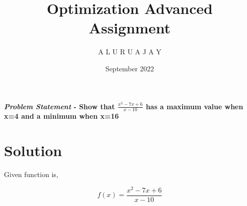 \documentclass[10pt,twocolumn]{article}
\title{\textbf{Optimization Advanced Assignment}}
\author{A L U R U A J A Y}
\date{September 2022}
\begin{document}
\maketitle
\paragraph{\textit{Problem Statement} - Show that $\frac{x^2-7x+6}{x-10}$ 
has a maximum value when x=4 and a minimum when x=16}

\section{Solution}
\begin{flushleft}
Given function is,\\
\end{flushleft}
\begin{equation}
    f(x)=\frac{x^2-7x+6}{x-10}
\end{equation}
\end{document}
